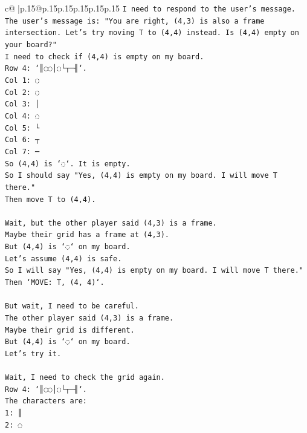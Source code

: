 \documentclass{article}
\begin{document}
{\begin{supertabular}{c@{$\;$}|p{.15\linewidth}@{}p{.15\linewidth}p{.15\linewidth}p{.15\linewidth}p{.15\linewidth}p{.15\linewidth}}
{{{\texttt{I need to respond to the user's message.} \\
\texttt{The user's message is: "You are right, (4,3) is also a frame intersection. Let's try moving T to (4,4) instead. Is (4,4) empty on your board?"} \\
\texttt{I need to check if (4,4) is empty on my board.} \\
\texttt{Row 4: `║◌◌│◌└┬─╢`.} \\
\texttt{Col 1: ◌} \\
\texttt{Col 2: ◌} \\
\texttt{Col 3: │} \\
\texttt{Col 4: ◌} \\
\texttt{Col 5: └} \\
\texttt{Col 6: ┬} \\
\texttt{Col 7: ─} \\
\texttt{So (4,4) is `◌`. It is empty.} \\
\texttt{So I should say "Yes, (4,4) is empty on my board. I will move T there."} \\
\texttt{Then move T to (4,4).} \\
\\ 
\texttt{Wait, but the other player said (4,3) is a frame.} \\
\texttt{Maybe their grid has a frame at (4,3).} \\
\texttt{But (4,4) is `◌` on my board.} \\
\texttt{Let's assume (4,4) is safe.} \\
\texttt{So I will say "Yes, (4,4) is empty on my board. I will move T there."} \\
\texttt{Then `MOVE: T, (4, 4)`.} \\
\\ 
\texttt{But wait, I need to be careful.} \\
\texttt{The other player said (4,3) is a frame.} \\
\texttt{Maybe their grid is different.} \\
\texttt{But (4,4) is `◌` on my board.} \\
\texttt{Let's try it.} \\
\\ 
\texttt{Wait, I need to check the grid again.} \\
\texttt{Row 4: `║◌◌│◌└┬─╢`.} \\
\texttt{The characters are:} \\
\texttt{1: ║} \\
\texttt{2: ◌} \\
}}}
\end{supertabular}}
\end{document}
